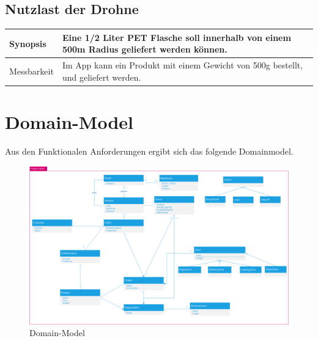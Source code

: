 \subsection{Nutzlast der Drohne}
\begin{tabular}{|p{}|p{}|} \hline
	Synopsis & Eine 1/2 Liter PET Flasche soll innerhalb von einem 500m Radius geliefert werden können. \\ \hline
	Messbarkeit & Im App kann ein Produkt mit einem Gewicht von 500g bestellt, und geliefert werden. \\ \hline
\end{tabular}


\section{Domain-Model}

Aus den Funktionalen Anforderungen ergibt sich das folgende Domainmodel.

\begin{figure}[h]
	\includegraphics[width=1.0\textwidth]{images/domainmodell.png}
	\caption{Domain-Model}
	\label{fig:domain-model}
\end{figure}

